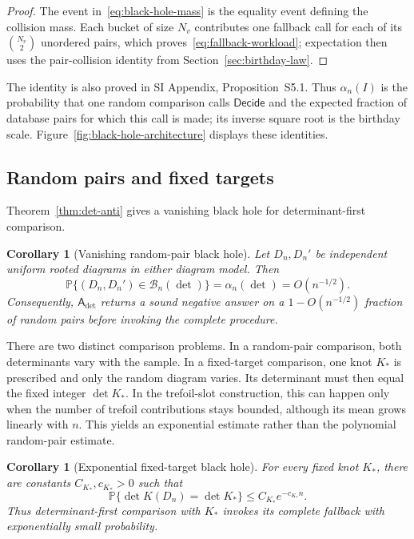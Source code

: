 \documentclass[9pt,twoside]{pnas-new}
\newtheorem{corollary}[theorem]{Corollary}
\theoremstyle{definition}
\theoremstyle{remark}
\renewcommand{\Pr}{\mathbb{P}}
\newcommand{\SILocation}[1]{SI Appendix, #1}
\newcommand{\SIFallbackIdentities}{Proposition~S5.1}
\begin{document}
\begin{proof}
The event in~\eqref{eq:black-hole-mass} is the equality event defining the collision mass.  Each bucket of size $N_v$ contributes one fallback call for each of its $\binom{N_v}{2}$ unordered pairs, which proves~\eqref{eq:fallback-workload}; expectation then uses the pair-collision identity from Section~\ref{sec:birthday-law}.
\end{proof}

The identity is also proved in \SILocation{\SIFallbackIdentities{}}.  Thus $\alpha_n(I)$ is the probability that one random comparison calls $\mathsf{Decide}$ and the expected fraction of database pairs for which this call is made; its inverse square root is the birthday scale.  Figure~\ref{fig:black-hole-architecture} displays these identities.

\subsection{Random pairs and fixed targets}
Theorem~\ref{thm:det-anti} gives a vanishing black hole for determinant-first comparison.

\begin{corollary}[Vanishing random-pair black hole]
\label{cor:random-pair-black-hole}
Let $D_n,D_n'$ be independent uniform rooted diagrams in either diagram model.  Then
\begin{equation}
 \Pr\{(D_n,D_n')\in\mathcal B_n(\det)\}
 =\alpha_n(\det)
 =O(n^{-1/2}).
 \label{eq:random-pair-black-hole-rate}
\end{equation}
Consequently, $\mathsf A_{\det}$ returns a sound negative answer on a $1-O(n^{-1/2})$ fraction of random pairs before invoking the complete procedure.
\end{corollary}

There are two distinct comparison problems.  In a random-pair comparison, both determinants vary with the sample.  In a fixed-target comparison, one knot $K_*$ is prescribed and only the random diagram varies.  Its determinant must then equal the fixed integer $\det K_*$.  In the trefoil-slot construction, this can happen only when the number of trefoil contributions stays bounded, although its mean grows linearly with $n$.  This yields an exponential estimate rather than the polynomial random-pair estimate.

\begin{corollary}[Exponential fixed-target black hole]
\label{cor:fixed-target-black-hole}
For every fixed knot $K_*$, there are constants $C_{K_*},c_{K_*}>0$ such that
\begin{equation}
 \Pr\{\det K(D_n)=\det K_*\}
 \le C_{K_*}e^{-c_{K_*}n}.
 \label{eq:fixed-target-exponential}
\end{equation}
Thus determinant-first comparison with $K_*$ invokes its complete fallback with exponentially small probability.
\end{corollary}
\end{document}
